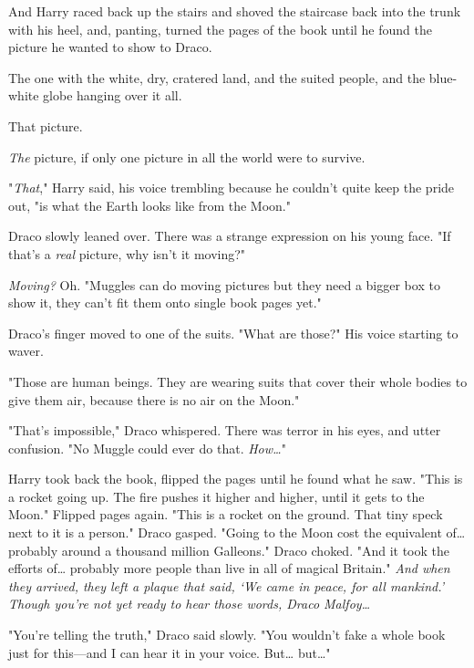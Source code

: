 And Harry raced back up the stairs and shoved the staircase back into the trunk
with his heel, and, panting, turned the pages of the book until he found the
picture he wanted to show to Draco.

The one with the white, dry, cratered land, and the suited people, and the
blue-white globe hanging over it all.

That picture.

\emph{The} picture, if only one picture in all the world were to survive.

"\emph{That}," Harry said, his voice trembling because he couldn't quite keep
the pride out, "is what the Earth looks like from the Moon."

Draco slowly leaned over. There was a strange expression on his young face. "If
that's a \emph{real} picture, why isn't it moving?"

\emph{Moving?} Oh. "Muggles can do moving pictures but they need a bigger box
to show it, they can't fit them onto single book pages yet."

Draco's finger moved to one of the suits. "What are those?" His voice starting
to waver.

"Those are human beings. They are wearing suits that cover their whole bodies
to give them air, because there is no air on the Moon."

"That's impossible," Draco whispered. There was terror in his eyes, and utter
confusion. "No Muggle could ever do that. \emph{How{\ldots}}"

Harry took back the book, flipped the pages until he found what he saw. "This
is a rocket going up. The fire pushes it higher and higher, until it gets to
the Moon." Flipped pages again. "This is a rocket on the ground. That tiny
speck next to it is a person." Draco gasped. "Going to the Moon cost the
equivalent of{\ldots} probably around a thousand million Galleons." Draco
choked. "And it took the efforts of{\ldots} probably more people than live in
all of magical Britain." \emph{And when they arrived, they left a plaque that
said, `We came in peace, for all mankind.' Though you're not yet ready to hear
those words, Draco Malfoy{\ldots}}

"You're telling the truth," Draco said slowly. "You wouldn't fake a whole book
just for this---and I can hear it in your voice. But{\ldots} but{\ldots}"

